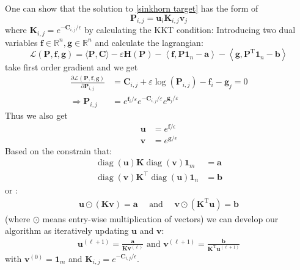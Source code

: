 \documentclass{article}
\begin{document}
One can show that the solution to \ref{sinkhorn target} has the form of 
\begin{equation}
\mathbf { P } _ { i , j } = \mathbf { u } _ { i } \mathbf { K } _ { i , j } \mathbf { v } _ { j }
\end{equation}
where $\mathbf { K } _ { i , j } = e^{-\mathbf{C}_{i,j}/\epsilon}$ by calculating the KKT condition:
Introducing two dual variables $\mathbf { f } \in \mathbb { R } ^ { n } , \mathbf { g } \in \mathbb { R } ^ { n }$ and calculate the lagrangian:
\begin{equation}
\mathcal { L } ( \mathbf { P } , \mathbf { f } , \mathbf { g } ) = \langle \mathbf { P } , \mathbf { C } \rangle - \varepsilon \mathbf { H } ( \mathbf { P } ) - \left\langle \mathbf { f } , \mathbf { P } \mathbf { 1 } _ { n } - \mathbf { a } \right\rangle - \left\langle \mathbf { g } , \mathbf { P } ^ { \mathrm { T } } \mathbf{ 1 } _ { n } - \mathbf { b } \right\rangle
\end{equation}
take first order gradient and we get
\begin{align}
\frac { \partial \mathcal { L } ( \mathbf { P } , \mathbf { f } , \mathbf { g } ) } { \partial \mathbf { P } _ { i , j } } &= \mathbf { C } _ { i , j } + \varepsilon \log \left( \mathbf { P } _ { i , j } \right) - \mathbf { f } _ { i } - \mathbf { g } _ { j } = 0\\
\Rightarrow\mathbf { P } _ { i , j } &= e ^ { \mathbf { f } _ { i } / \varepsilon } e ^ { - \mathbf { C } _ { i , j } / \varepsilon } e ^ { \mathbf { g } _ { j } / \varepsilon }
\label{solution for P}
\end{align}
Thus we also get
\begin{align}
\mathbf{u} &= e^{\mathbf{f}/\epsilon}\\
\mathbf{v} &= e^{\mathbf{g}/\epsilon}
\end{align}
Based on the constrain that:
\begin{align}
\operatorname { diag } ( \mathbf { u } ) \mathbf { K } \operatorname { diag } ( \mathbf { v } ) \mathbf { 1 } _ { m } &= \mathbf { a }\\
\operatorname { diag } ( \mathbf { v } ) \mathbf { K } ^ { \top } \operatorname { diag } ( \mathbf { u } ) \mathbf { 1 } _ { n } &= \mathbf { b }
\end{align}
or :
\begin{align}
\mathbf { u } \odot ( \mathbf { K } \mathbf { v } ) = \mathbf { a } \quad \text { and } \quad \mathbf { v } \odot \left( \mathbf { K } ^ { \mathrm { T } } \mathbf { u } \right) = \mathbf { b }
\label{solution for marginal}
\end{align}
(where $\odot$ means entry-wise multiplication of vectors) we can develop our algorithm as iteratively updating $\mathbf { u }$ and $\mathbf { v }$:
\begin{align}
\mathbf { u } ^ { ( \ell + 1 ) }  { = } \frac { \mathbf { a } } { \mathbf { K } \mathbf { v } ^ { ( \ell ) } } \text { and } \mathbf { v } ^ { ( \ell + 1 ) } { = } \frac { \mathbf { b } } { \mathbf { K } ^ { \mathrm { T } } \mathbf { u } ^ { ( \ell + 1 ) } }
\end{align}
with $\mathbf { v } ^ { ( 0 ) } = \mathbf { 1 } _ { m }$ and $\mathbf { K } _ { i ,j } = e^{-\mathbf{C}_{i,j}/\epsilon}$.
\end{document}
